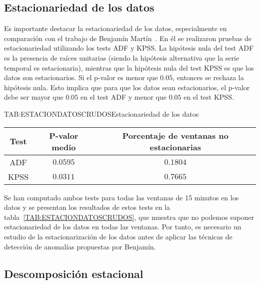 
\subsection{Estacionariedad de los datos}\label{SUBSEC:ESTACIONARIEDAD}

Es importante destacar la estacionariedad de los datos, especialmente en comparación con el trabajo de Benjamín Martín~\cite{benjamin2023}. En él se realizaron pruebas de estacionariedad utilizando los tests \ac{ADF} y \ac{KPSS}. La hipótesis nula del test ADF es la presencia de raíces unitarias (siendo la hipótesis alternativa que la serie temporal es estacionaria), mientras que la hipótesis nula del test KPSS es que los datos son estacionarios. Si el p-valor es menor que $0.05$, entonces se rechaza la hipótesis nula. Esto implica que para que los datos sean estacionarios, el p-valor debe ser mayor que $0.05$ en el test ADF y menor que $0.05$ en el test KPSS.

\begin{table}[Estacionariedad de los datos]{TAB:ESTACIONDATOSCRUDOS}{Estacionariedad de los datos}
    \begin{tabular}{|c|c|c|}
        \hline
        \textbf{Test} & \textbf{P-valor medio} & \textbf{Porcentaje de ventanas no estacionarias} \\
        \hline
        ADF & $0.0595$ & $0.1804$ \\
        KPSS & $0.0311$ & $0.7665$ \\
        \hline
    \end{tabular}
\end{table}

Se han computado ambos tests para todas las ventanas de 15 minutos en los datos y se presentan los resultados de estos tests en la tabla~\ref{TAB:ESTACIONDATOSCRUDOS}, que muestra que no podemos suponer estacionariedad de los datos en todas las ventanas. Por tanto, es necesario un estudio de la estacionarización de los datos antes de aplicar las técnicas de detección de anomalías propuestas por Benjamín.

\subsection{Descomposición estacional}\label{SUBSEC:DESESTACIONALIDAD}

